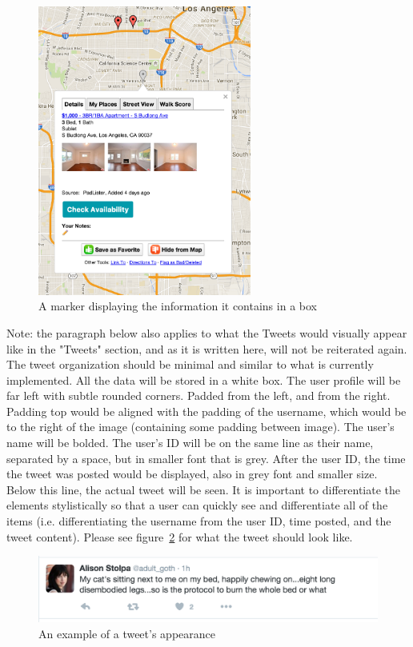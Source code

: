\documentclass[11pt]{article}
\begin{document}
\begin{figure}[H]
    \centering
    \includegraphics[width=7cm]{markerBox}
    \caption{A marker displaying the information it contains in a box}
    \label{fig:markerDisplay}                
\end{figure}

Note: the paragraph below also applies to what the Tweets would visually appear like in the "Tweets" section, and as it is written here, will not be reiterated again. The tweet organization should be minimal and similar to what is currently implemented. All the data will be stored in a white box. The user profile will be far left with subtle rounded corners. Padded from the left, and from the right. Padding top would be aligned with the padding of the username, which would be to the right of the image (containing some padding between image). The user's name will be bolded. The user's ID will be on the same line as their name, separated by a space, but in smaller font that is grey. After the user ID, the time the tweet was posted would be displayed, also in grey font and smaller size. Below this line, the actual tweet will be seen. It is important to differentiate the elements stylistically so that a user can quickly see and differentiate all of the items (i.e. differentiating the username from the user ID, time posted, and the tweet content). Please see figure~\ref{fig:tweetExample} for what the tweet should look like.

\begin{figure}[H]
    \centering
    \includegraphics[width=20cm]{tweetExample}
    \caption{An example of a tweet's appearance}
    \label{fig:tweetExample}                
\end{figure}
\end{document}
